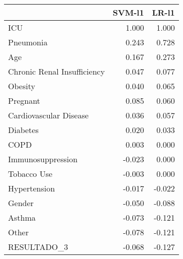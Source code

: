 \begin{tabular}{lrr}
\toprule
{} &  SVM-l1 &  LR-l1 \\
\midrule
ICU                         &   1.000 &  1.000 \\
Pneumonia                   &   0.243 &  0.728 \\
Age                         &   0.167 &  0.273 \\
Chronic Renal Insufficiency &   0.047 &  0.077 \\
Obesity                     &   0.040 &  0.065 \\
Pregnant                    &   0.085 &  0.060 \\
Cardiovascular Disease      &   0.036 &  0.057 \\
Diabetes                    &   0.020 &  0.033 \\
COPD                        &   0.003 &  0.000 \\
Immunosuppression           &  -0.023 &  0.000 \\
Tobacco Use                 &  -0.003 &  0.000 \\
Hypertension                &  -0.017 & -0.022 \\
Gender                      &  -0.050 & -0.088 \\
Asthma                      &  -0.073 & -0.121 \\
Other                       &  -0.078 & -0.121 \\
RESULTADO\_3                 &  -0.068 & -0.127 \\
\bottomrule
\end{tabular}
